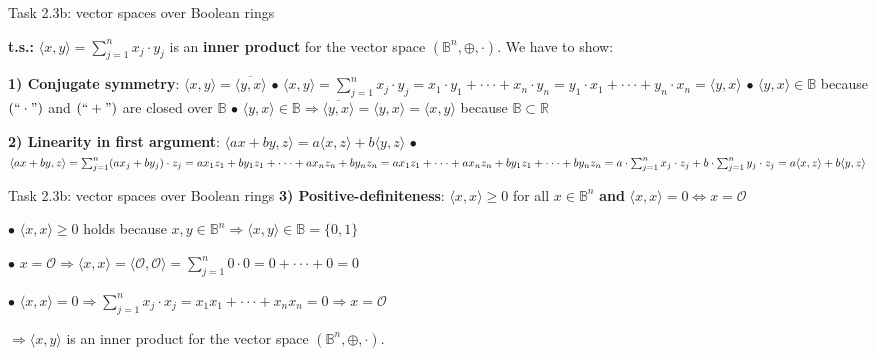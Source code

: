 \documentclass[aspectratio=169]{beamer}
\begin{document}
\begin{frame}{Task 2.3b: vector spaces over Boolean rings}

\textbf{t.s.:} $\langle x, y\rangle = \sum^{n}_{j=1} x_j \cdot y_j$  is an \textbf{inner product} for the vector space $(\mathbb{B}^n, \oplus, \cdot )$.\newline
We have to show:\newline

\textbf{1) Conjugate symmetry}: $\langle x, y\rangle = \overline{\langle y, x\rangle}$\newline
$\bullet$ $\langle x, y\rangle = \sum^{n}_{j=1} x_j \cdot y_j = x_1 \cdot y_1 + \cdot \cdot \cdot + x_n \cdot y_n = y_1 \cdot x_1 + \cdot \cdot \cdot + y_n \cdot x_n = \langle y, x\rangle$\newline
$\bullet$ $\langle y, x\rangle \in \mathbb{B}$ because $(``\cdot")$ and $(``+")$ are closed over $\mathbb{B}$\newline
$\bullet$ $\langle y, x\rangle \in \mathbb{B} \Rightarrow \overline{\langle y, x\rangle} = \langle y, x\rangle = \langle x, y\rangle$ because $\mathbb{B} \subset \mathbb{R}$\newline

\textbf{2) Linearity in first argument}: $\langle ax + by, z\rangle = a\langle x, z\rangle + b\langle y, z\rangle$\newline
$\bullet$ $\langle ax + by, z\rangle = \sum^{n}_{j=1} (ax_j + by_j) \cdot z_j = ax_1z_1 + by_1z_1 + \cdot \cdot \cdot + ax_nz_n + by_nz_n\newline
= ax_1z_1 + \cdot \cdot \cdot+ ax_nz_n + by_1z_1+ \cdot \cdot \cdot + by_nz_n\newline
= a\cdot \sum^{n}_{j=1} x_j \cdot z_j + b\cdot \sum^{n}_{j=1} y_j \cdot z_j = a\langle x, z\rangle + b\langle y, z\rangle$\newline

\end{frame}
\begin{frame}{Task 2.3b: vector spaces over Boolean rings}
\textbf{3) Positive-definiteness}: $\langle x,x\rangle \geq 0$ for all $x \in \mathbb{B}^n$ \textbf{and} $\langle x,x\rangle = 0 \Leftrightarrow x = \mathcal{O}$\newline

$\bullet$ $\langle x,x\rangle \geq 0$ holds because $x, y \in \mathbb{B}^n \Rightarrow \langle x,y\rangle \in \mathbb{B}=\{0, 1\}$\newline

$\bullet$ $x = \mathcal{O} \Rightarrow \langle x,x\rangle = \langle \mathcal{O},\mathcal{O}\rangle = \sum^{n}_{j=1} 0 \cdot 0 = 0 + \cdot \cdot \cdot + 0 = 0$ \newline

$\bullet$ $\langle x,x\rangle = 0 \Rightarrow \sum^{n}_{j=1} x_j \cdot x_j = x_1x_1 + \cdot \cdot \cdot + x_nx_n = 0 \Rightarrow x = \mathcal{O}$ \newline

$\Rightarrow \langle x, y\rangle$ is an inner product for the vector space $(\mathbb{B}^n, \oplus, \cdot )$.

\end{frame}
\end{document}
